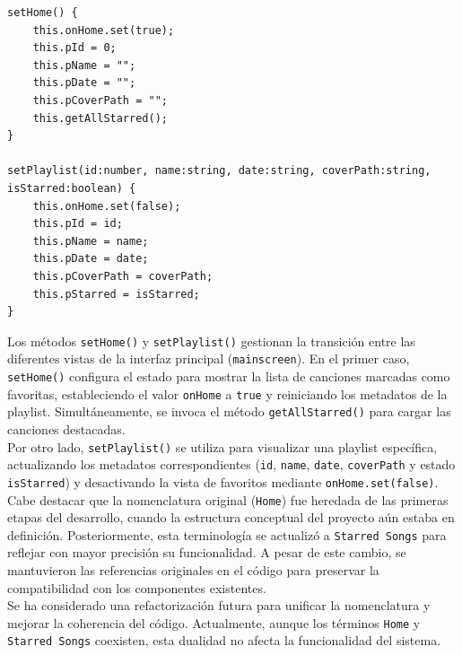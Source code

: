 \documentclass[11pt, a4paper]{article}
\begin{document}
                \begin{lstlisting}[caption={setHome() y setPlaylist()}]
setHome() {
    this.onHome.set(true);
    this.pId = 0;
    this.pName = "";
    this.pDate = "";
    this.pCoverPath = "";
    this.getAllStarred();
}

setPlaylist(id:number, name:string, date:string, coverPath:string, isStarred:boolean) {
    this.onHome.set(false);
    this.pId = id;
    this.pName = name;
    this.pDate = date;
    this.pCoverPath = coverPath;
    this.pStarred = isStarred;
}
                \end{lstlisting}

                Los métodos \texttt{setHome()} y \texttt{setPlaylist()} gestionan la transición entre las diferentes vistas de la interfaz principal (\texttt{mainscreen}). En el primer caso, \texttt{setHome()} configura el estado para mostrar la lista de canciones marcadas como favoritas, estableciendo el valor \texttt{onHome} a \texttt{true} y reiniciando los metadatos de la playlist. Simultáneamente, se invoca el método \texttt{getAllStarred()} para cargar las canciones destacadas. \\

                Por otro lado, \texttt{setPlaylist()} se utiliza para visualizar una playlist específica, actualizando los metadatos correspondientes (\texttt{id}, \texttt{name}, \texttt{date}, \texttt{coverPath} y estado \texttt{isStarred}) y desactivando la vista de favoritos mediante \texttt{onHome.set(false)}. \\

                Cabe destacar que la nomenclatura original (\texttt{Home}) fue heredada de las primeras etapas del desarrollo, cuando la estructura conceptual del proyecto aún estaba en definición. Posteriormente, esta terminología se actualizó a \texttt{Starred Songs} para reflejar con mayor precisión su funcionalidad. A pesar de este cambio, se mantuvieron las referencias originales en el código para preservar la compatibilidad con los componentes existentes. \\

                Se ha considerado una refactorización futura para unificar la nomenclatura y mejorar la coherencia del código. Actualmente, aunque los términos \texttt{Home} y \texttt{Starred Songs} coexisten, esta dualidad no afecta la funcionalidad del sistema. \\
\end{document}
